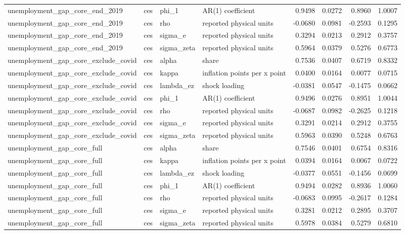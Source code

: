 \begin{tabular}{llllrrrr}
unemployment\_gap\_core\_end\_2019 & ces & phi\_1 & AR(1) coefficient & 0.9498 & 0.0272 & 0.8960 & 1.0007 \\
unemployment\_gap\_core\_end\_2019 & ces & rho & reported physical units & -0.0680 & 0.0981 & -0.2593 & 0.1295 \\
unemployment\_gap\_core\_end\_2019 & ces & sigma\_e & reported physical units & 0.3294 & 0.0213 & 0.2912 & 0.3757 \\
unemployment\_gap\_core\_end\_2019 & ces & sigma\_zeta & reported physical units & 0.5964 & 0.0379 & 0.5276 & 0.6773 \\
unemployment\_gap\_core\_exclude\_covid & ces & alpha & share & 0.7536 & 0.0407 & 0.6719 & 0.8332 \\
unemployment\_gap\_core\_exclude\_covid & ces & kappa & inflation points per x point & 0.0400 & 0.0164 & 0.0077 & 0.0715 \\
unemployment\_gap\_core\_exclude\_covid & ces & lambda\_ez & shock loading & -0.0381 & 0.0547 & -0.1475 & 0.0662 \\
unemployment\_gap\_core\_exclude\_covid & ces & phi\_1 & AR(1) coefficient & 0.9496 & 0.0276 & 0.8951 & 1.0044 \\
unemployment\_gap\_core\_exclude\_covid & ces & rho & reported physical units & -0.0687 & 0.0982 & -0.2625 & 0.1218 \\
unemployment\_gap\_core\_exclude\_covid & ces & sigma\_e & reported physical units & 0.3291 & 0.0214 & 0.2912 & 0.3755 \\
unemployment\_gap\_core\_exclude\_covid & ces & sigma\_zeta & reported physical units & 0.5963 & 0.0390 & 0.5248 & 0.6763 \\
unemployment\_gap\_core\_full & ces & alpha & share & 0.7546 & 0.0401 & 0.6754 & 0.8316 \\
unemployment\_gap\_core\_full & ces & kappa & inflation points per x point & 0.0394 & 0.0164 & 0.0067 & 0.0722 \\
unemployment\_gap\_core\_full & ces & lambda\_ez & shock loading & -0.0377 & 0.0551 & -0.1456 & 0.0699 \\
unemployment\_gap\_core\_full & ces & phi\_1 & AR(1) coefficient & 0.9494 & 0.0282 & 0.8936 & 1.0060 \\
unemployment\_gap\_core\_full & ces & rho & reported physical units & -0.0683 & 0.0995 & -0.2617 & 0.1284 \\
unemployment\_gap\_core\_full & ces & sigma\_e & reported physical units & 0.3281 & 0.0212 & 0.2895 & 0.3707 \\
unemployment\_gap\_core\_full & ces & sigma\_zeta & reported physical units & 0.5978 & 0.0384 & 0.5279 & 0.6810 \\

\end{tabular}
